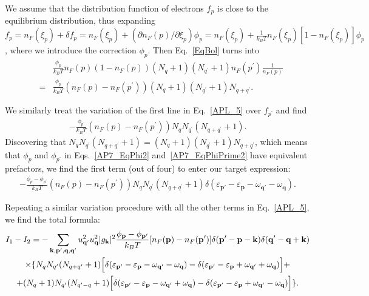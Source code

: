 We assume that the distribution function of electrons $f_p$ is close to the equilibrium distribution, thus expanding $f_p=n_F(\xi_p)+\delta f_p=n_F(\xi_p)+(\partial n_F(p)/\partial \xi_p)\phi_p=n_F(\xi_p)+\frac{1}{k_BT}n_F(\xi_p)[1-n_F(\xi_p)]\phi_p$, where we introduce the correction $\phi_p$. Then Eq.~\eqref{EqBol} turns into
%
\begin{eqnarray}
\label{AP7_EqPhi2}
&{}&{}\frac{\phi_p}{k_BT}n_F(p)(1-n_F(p))
(N_q+1)(N_{q^\prime}+1)n_F(p^\prime)\frac{1}{n_F(p)}\\\nonumber
&=&\frac{\phi_p}{k_BT}(n_F(p)-n_F(p^\prime))
(N_q+1)(N_{q^\prime}+1)N_{q+q^\prime}.
\end{eqnarray}
%

We similarly treat the variation of the first line in Eq.~\eqref{APL_5}  over $f_{p^\prime}$ and find
%
\begin{eqnarray}
\label{AP7_EqPhiPrime2}
-\frac{\phi_{p^\prime}}{k_BT}(n_F(p)-n_F(p^\prime))
N_qN_{q^\prime}(N_{q+q^\prime}+1).
\end{eqnarray}
%
Discovering that $N_qN_{q^\prime}(N_{q+q^\prime}+1)=(N_q+1)(N_{q^\prime}+1)N_{q+q^\prime}$, which means that $\phi_p$ and $\phi_{p^\prime}$ in Eqs.~\eqref{AP7_EqPhi2} and~\eqref{AP7_EqPhiPrime2} have equivalent prefactors, we find the first term (out of four) to enter our target expression:
%
\begin{eqnarray}
-\frac{\phi_p-\phi_{p^\prime}}{k_BT}(n_F(p)-n_F(p^\prime))
N_qN_{q^\prime}(N_{q+q^\prime}+1)\delta(\varepsilon_{\textbf{p}'}-\varepsilon_{\textbf{p}}-\omega_{\textbf{q}'}-\omega_{\textbf{q}}).
\end{eqnarray}
%

Repeating a similar variation procedure with all the other terms in Eq.~\eqref{APL_5}, we find the total formula:
%
\begin{gather}\label{EqZaiatz}
I_1-I_2=-\sum_{\mathbf{k},\mathbf{p}',\mathbf{q},\mathbf{q}'}u^2_{\textbf{q}'}u^2_{\textbf{q}}|g_\textbf{k}|^2
\frac{\phi_{\mathbf{p}}-\phi_{\mathbf{p^\prime}}}{k_BT}
[n_F(\mathbf{p})-n_F(\mathbf{p}^\prime)]
\delta(\textbf{p}'-\textbf{p}-\textbf{k})\delta(\textbf{q}'-\textbf{q}+\textbf{k})\\
\nonumber
\times
\{
N_{q}N_{q^\prime}(N_{q+q^\prime}+1)
\Bigr[\delta(\varepsilon_{\textbf{p}'}-\varepsilon_{\textbf{p}}-\omega_{\textbf{q}'}-\omega_{\textbf{q}})
-
\delta(\varepsilon_{\textbf{p}'}-\varepsilon_{\textbf{p}}+\omega_{\textbf{q}'}+\omega_{\textbf{q}})\Bigl]+\\
\nonumber
+
(N_{q}+1)N_{q^\prime}(N_{q^\prime-q}+1)
\Bigr[\delta(\varepsilon_{\textbf{p}'}-\varepsilon_{\textbf{p}}-\omega_{\textbf{q}'}+\omega_{\textbf{q}})
-
\delta(\varepsilon_{\textbf{p}'}-\varepsilon_{\textbf{p}}+\omega_{\textbf{q}'}-\omega_{\textbf{q}})\Bigl]
\}.
\end{gather}
%

